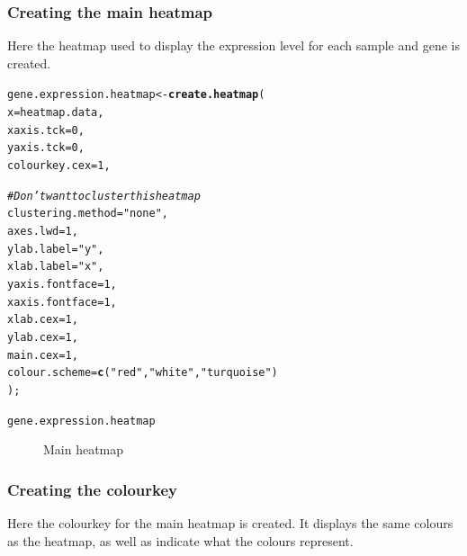 \documentclass[letterpaper]{article}\usepackage[]{graphicx}\usepackage[]{color}
\makeatletter
\newcommand{\hlnum}[1]{\textcolor[rgb]{0.686,0.059,0.569}{#1}}%
\newcommand{\hlstr}[1]{\textcolor[rgb]{0.192,0.494,0.8}{#1}}%
\newcommand{\hlcom}[1]{\textcolor[rgb]{0.678,0.584,0.686}{\textit{#1}}}%
\newcommand{\hlstd}[1]{\textcolor[rgb]{0.345,0.345,0.345}{#1}}%
\newcommand{\hlkwb}[1]{\textcolor[rgb]{0.69,0.353,0.396}{#1}}%
\newcommand{\hlkwc}[1]{\textcolor[rgb]{0.333,0.667,0.333}{#1}}%
\newcommand{\hlkwd}[1]{\textcolor[rgb]{0.737,0.353,0.396}{\textbf{#1}}}%
\newenvironment{kframe}{%
 \def\at@end@of@kframe{}%
 \ifinner\ifhmode%
  \def\at@end@of@kframe{\end{minipage}}%
  \begin{minipage}{\columnwidth}%
 \fi\fi%
 \def\FrameCommand##1{\hskip\@totalleftmargin \hskip-\fboxsep
 \colorbox{shadecolor}{##1}\hskip-\fboxsep
     \hskip-\linewidth \hskip-\@totalleftmargin \hskip\columnwidth}%
 \MakeFramed {\advance\hsize-\width
   \@totalleftmargin\z@ \linewidth\hsize
   \@setminipage}}%
 {\par\unskip\endMakeFramed%
 \at@end@of@kframe}
\newenvironment{knitrout}{}{} %
\makeatother
\begin{document}
\subsubsection{Creating the main heatmap}

Here the heatmap used to display the expression level for each sample and gene is created. 

\begin{knitrout}
\color{fgcolor}\begin{kframe}
\begin{alltt}
\hlstd{gene.expression.heatmap} \hlkwb{<-} \hlkwd{create.heatmap}\hlstd{(}
     \hlkwc{x} \hlstd{= heatmap.data,}
     \hlkwc{xaxis.tck} \hlstd{=} \hlnum{0}\hlstd{,}
     \hlkwc{yaxis.tck} \hlstd{=} \hlnum{0}\hlstd{,}
     \hlkwc{colourkey.cex} \hlstd{=} \hlnum{1}\hlstd{,}

     \hlcom{# Don't want to cluster this heatmap}
     \hlkwc{clustering.method} \hlstd{=} \hlstr{"none"}\hlstd{,}
     \hlkwc{axes.lwd} \hlstd{=} \hlnum{1}\hlstd{,}
     \hlkwc{ylab.label} \hlstd{=} \hlstr{"y"}\hlstd{,}
     \hlkwc{xlab.label} \hlstd{=} \hlstr{"x"}\hlstd{,}
     \hlkwc{yaxis.fontface} \hlstd{=} \hlnum{1}\hlstd{,}
     \hlkwc{xaxis.fontface} \hlstd{=} \hlnum{1}\hlstd{,}
     \hlkwc{xlab.cex} \hlstd{=} \hlnum{1}\hlstd{,}
     \hlkwc{ylab.cex} \hlstd{=} \hlnum{1}\hlstd{,}
     \hlkwc{main.cex} \hlstd{=} \hlnum{1}\hlstd{,}
     \hlkwc{colour.scheme} \hlstd{=} \hlkwd{c}\hlstd{(}\hlstr{"red"}\hlstd{,} \hlstr{"white"}\hlstd{,} \hlstr{"turquoise"}\hlstd{)}
     \hlstd{);}

\hlstd{gene.expression.heatmap}
\end{alltt}
\end{kframe}\begin{figure}[]


{\centering {} 

}

\caption[Main heatmap]{Main heatmap\label{fig:multiplotex2_heatmap}}
\end{figure}


\end{knitrout}

\subsubsection{Creating the colourkey}

Here the colourkey for the main heatmap is created. It displays the same colours as the heatmap, as well as indicate what the colours represent.
\end{document}
